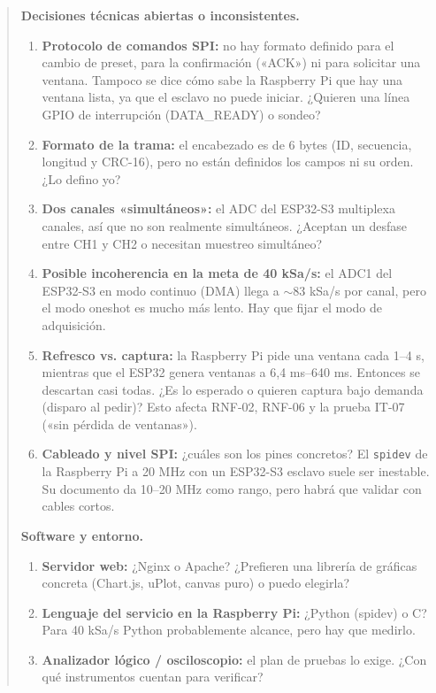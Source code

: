 \documentclass[12pt,a4paper]{article}
\begin{document}
\begin{quote}
\textbf{Decisiones técnicas abiertas o inconsistentes.}
\begin{enumerate}[leftmargin=*, start=5]
\item \textbf{Protocolo de comandos SPI:} no hay formato definido para el cambio de preset, para la confirmación («ACK») ni para solicitar una ventana. Tampoco se dice cómo sabe la Raspberry Pi que hay una ventana lista, ya que el esclavo no puede iniciar. ¿Quieren una línea GPIO de interrupción (DATA\_READY) o sondeo?
\item \textbf{Formato de la trama:} el encabezado es de 6 bytes (ID, secuencia, longitud y CRC-16), pero no están definidos los campos ni su orden. ¿Lo defino yo?
\item \textbf{Dos canales «simultáneos»:} el ADC del ESP32-S3 multiplexa canales, así que no son realmente simultáneos. ¿Aceptan un desfase entre CH1 y CH2 o necesitan muestreo simultáneo?
\item \textbf{Posible incoherencia en la meta de 40 kSa/s:} el ADC1 del ESP32-S3 en modo continuo (DMA) llega a $\sim$83 kSa/s por canal, pero el modo oneshot es mucho más lento. Hay que fijar el modo de adquisición.
\item \textbf{Refresco vs. captura:} la Raspberry Pi pide una ventana cada 1--4 s, mientras que el ESP32 genera ventanas a 6,4 ms--640 ms. Entonces se descartan casi todas. ¿Es lo esperado o quieren captura bajo demanda (disparo al pedir)? Esto afecta RNF-02, RNF-06 y la prueba IT-07 («sin pérdida de ventanas»).
\item \textbf{Cableado y nivel SPI:} ¿cuáles son los pines concretos? El \texttt{spidev} de la Raspberry Pi a 20 MHz con un ESP32-S3 esclavo suele ser inestable. Su documento da 10--20 MHz como rango, pero habrá que validar con cables cortos.
\end{enumerate}

\textbf{Software y entorno.}
\begin{enumerate}[leftmargin=*, start=11]
\item \textbf{Servidor web:} ¿Nginx o Apache? ¿Prefieren una librería de gráficas concreta (Chart.js, uPlot, canvas puro) o puedo elegirla?
\item \textbf{Lenguaje del servicio en la Raspberry Pi:} ¿Python (spidev) o C? Para 40 kSa/s Python probablemente alcance, pero hay que medirlo.
\item \textbf{Analizador lógico / osciloscopio:} el plan de pruebas lo exige. ¿Con qué instrumentos cuentan para verificar?
\end{enumerate}


\end{quote}
\end{document}
